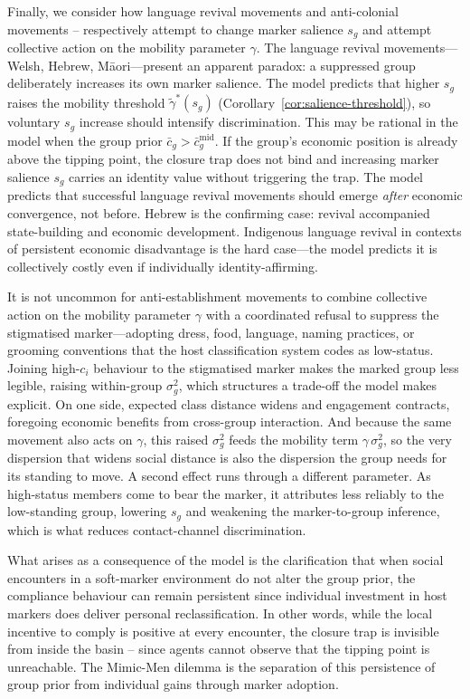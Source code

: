 \documentclass[pdflatex,sn-basic]{sn-jnl}
\theoremstyle{thmstyleone}
\numberwithin{proposition}{subsection}
\begin{document}
Finally, we consider how language revival movements and anti-colonial movements -- respectively attempt to change marker salience $s_g$ and attempt collective action on the mobility parameter $\gamma$. The language revival movements---Welsh, Hebrew, M\={a}ori---present an
apparent paradox: a suppressed group deliberately increases its own
marker salience. The model predicts that higher $s_g$ raises the
mobility threshold $\tilde{\gamma}^*(s_g)$
(Corollary~\ref{cor:salience-threshold}), so voluntary $s_g$ increase
should intensify discrimination. This may be rational in the model
when the group prior $\bar{c}_g >
\bar{c}_g^{\mathrm{mid}}$. If the group's economic position is
already above the tipping point, the closure trap does not bind and
increasing marker salience $s_g$ carries an identity value without triggering the
trap. The model predicts that successful language revival movements
should emerge \emph{after} economic convergence, not before. Hebrew
is the confirming case: revival accompanied state-building and
economic development. Indigenous language revival in contexts of
persistent economic disadvantage is the hard case---the model
predicts it is collectively costly even if individually
identity-affirming. 

It is not uncommon for anti-establishment movements to combine
collective action on the mobility parameter $\gamma$ with a
coordinated refusal to suppress the stigmatised marker---adopting
dress, food, language, naming practices, or grooming conventions
that the host classification system codes as low-status. Joining
high-$c_i$ behaviour to the stigmatised marker makes the marked group
less legible, raising within-group $\sigma_g^2$, which structures a
trade-off the model makes explicit. On one side, expected class
distance widens and engagement contracts, foregoing economic benefits
from cross-group interaction. And because the same movement also acts
on $\gamma$, this raised $\sigma_g^2$ feeds the mobility term
$\gamma\,\sigma_g^2$, so the very dispersion that widens social distance
is also the dispersion the group needs for its standing to move. A
second effect runs through a different parameter. As high-status
members come to bear the marker, it attributes less reliably to the
low-standing group, lowering $s_g$ and weakening the marker-to-group
inference, which is what reduces contact-channel discrimination. 

What arises as a consequence of the model is the clarification that when social encounters in a soft-marker environment do not alter the group prior, the compliance behaviour can remain persistent since individual
investment in host markers does deliver personal reclassification. In other words, while the local incentive to comply is positive
at every encounter, the closure trap is invisible from inside the
basin -- since agents cannot observe that the tipping point is
unreachable. The Mimic-Men dilemma is the separation of this persistence of group prior from individual gains through marker adoption.
\end{document}
